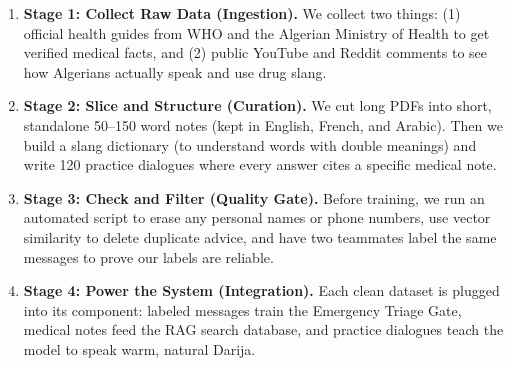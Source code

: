 \documentclass[10pt,a4paper]{article}
\begin{document}
\begin{center}
\end{center}

\vspace{2mm}
\vspace{1mm}

\begin{enumerate}\itemsep 1.0mm
  \item \textbf{Stage 1: Collect Raw Data (Ingestion).} We collect two things: (1) official health guides from WHO and the Algerian Ministry of Health to get verified medical facts, and (2) public YouTube and Reddit comments to see how Algerians actually speak and use drug slang.
  \item \textbf{Stage 2: Slice and Structure (Curation).} We cut long PDFs into short, standalone 50--150 word notes (kept in English, French, and Arabic). Then we build a slang dictionary (to understand words with double meanings) and write 120 practice dialogues where every answer cites a specific medical note.
  \item \textbf{Stage 3: Check and Filter (Quality Gate).} Before training, we run an automated script to erase any personal names or phone numbers, use vector similarity to delete duplicate advice, and have two teammates label the same messages to prove our labels are reliable.
  \item \textbf{Stage 4: Power the System (Integration).} Each clean dataset is plugged into its component: labeled messages train the Emergency Triage Gate, medical notes feed the RAG search database, and practice dialogues teach the model to speak warm, natural Darija.
\end{enumerate}
\end{document}
